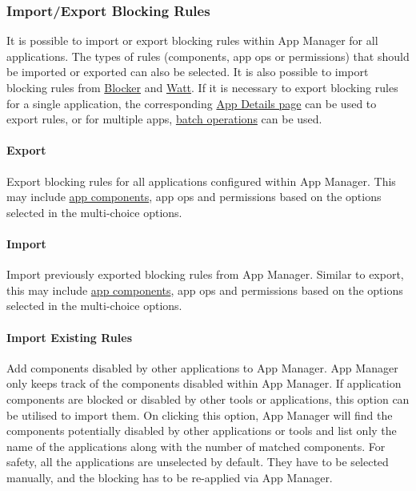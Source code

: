 \subsubsection{Import/Export Blocking Rules} %
It is possible to import or export blocking rules within App Manager for all applications. The types of rules (components, app ops or permissions) that should be imported or exported can also be selected.
It is also possible to import blocking rules from \href{https://github.com/lihenggui/blocker}{Blocker} and \href{https://github.com/tuyafeng/Watt}{Watt}.
If it is necessary to export blocking rules for a single application, the corresponding \hyperref[sec:app-details-page]{App Details page} can be used to export rules, or for multiple apps, \hyperref[subsec:batch-operations]{batch operations} can be used.


\paragraph{Export} Export blocking rules for all applications configured within App Manager.
This may include \hyperref[subsec:faq:what-are-app-components]{app components}, app ops and permissions based on the options selected in the multi-choice options.

\paragraph{Import} Import previously exported blocking rules from App Manager.
Similar to export, this may include \hyperref[subsec:faq:what-are-app-components]{app components}, app ops and permissions based on the options selected in the multi-choice options.

\paragraph{Import Existing Rules}\label{par:import-existing-rules}
Add components disabled by other applications to App Manager. App Manager only keeps track of the components disabled within App Manager.
If application components are blocked or disabled by other tools or applications, this option can be utilised to import them.
On clicking this option, App Manager will find the components potentially disabled by other applications or tools and list only the name of the applications along with the number of matched components.
For safety, all the applications are unselected by default. They have to be selected manually, and the blocking has to be re-applied via App Manager.

